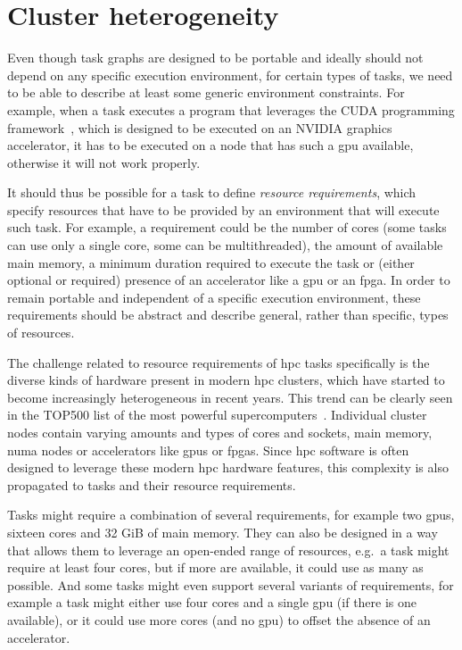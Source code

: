 \section{Cluster heterogeneity}
Even though task graphs are designed to be portable and ideally should not depend on any specific
execution environment, for certain types of tasks, we need to be able to describe at least some
generic environment constraints. For example, when a task executes a program that leverages the
CUDA programming framework~\cite{cuda}, which is designed to be executed on an
NVIDIA graphics accelerator, it has to be executed on a node that has such a
\gls{gpu} available, otherwise it will not work properly.

It should thus be possible for a task to define \emph{resource requirements}, which specify
resources that have to be provided by an environment that will execute such task. For example, a
requirement could be the number of cores (some tasks can use only a single core, some can be
multithreaded), the amount of available main memory, a minimum duration required to execute the
task or (either optional or required) presence of an accelerator like a \gls{gpu}
or an \gls{fpga}. In order to remain portable and independent of a specific
execution environment, these requirements should be abstract and describe general, rather than
specific, types of resources.

The challenge related to resource requirements of \gls{hpc} tasks specifically is
the diverse kinds of hardware present in modern \gls{hpc} clusters, which have
started to become increasingly heterogeneous in recent years. This trend can be clearly seen in the
TOP500 list of the most powerful supercomputers~\cite{top500analysis}. Individual cluster
nodes contain varying amounts and types of cores and sockets, main memory,
\gls{numa} nodes or accelerators like \glspl{gpu} or
\glspl{fpga}. Since \gls{hpc} software is often designed to
leverage these modern \gls{hpc} hardware features, this complexity is also
propagated to tasks and their resource requirements.

Tasks might require a combination of several requirements, for example two
\glspl{gpu}, sixteen cores and 32 GiB of main memory. They can also be designed in
a way that allows them to leverage an open-ended range of resources, e.g.\ a task might require at
least four cores, but if more are available, it could use as many as possible. And some tasks might
even support several variants of requirements, for example a task might either use four cores and a
single \gls{gpu} (if there is one available), or it could use more cores (and no \gls{gpu})
to offset the absence of an accelerator.

